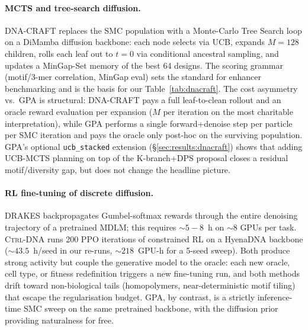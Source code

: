 \documentclass{article}
\theoremstyle{definition}
\theoremstyle{remark}
\newcommand{\gpa}{\textsc{GPA}\xspace}
\newcommand{\drakes}{\textsc{DRAKES}\xspace}
\newcommand{\ctrldna}{\textsc{Ctrl-DNA}\xspace}
\newcommand{\dnacraft}{\textsc{DNA-CRAFT}\xspace}
\begin{document}
\paragraph{MCTS and tree-search diffusion.}
\dnacraft{} \citep{dnacraft2026} replaces the SMC population with a Monte-Carlo Tree Search loop on a DiMamba diffusion backbone: each node selects via UCB, expands $M\!=\!128$ children, rolls each leaf out to $t\!=\!0$ via conditional ancestral sampling, and updates a MinGap-Set memory of the best 64 designs. The scoring grammar (motif/3-mer correlation, MinGap eval) sets the standard for enhancer benchmarking and is the basis for our Table~\ref{tab:dnacraft}. The cost asymmetry vs.\ \gpa{} is structural: \dnacraft{} pays a full leaf-to-clean rollout and an oracle reward evaluation per expansion ($M$ per iteration on the most charitable interpretation), while \gpa{} performs a single forward+denoise step per particle per SMC iteration and pays the oracle only post-hoc on the surviving population. \gpa{}'s optional \texttt{ucb\_stacked} extension (\S\ref{sec:results:dnacraft}) shows that adding UCB-MCTS planning on top of the K-branch+DPS proposal closes a residual motif/diversity gap, but does not change the headline picture.

\paragraph{RL fine-tuning of discrete diffusion.}
\drakes{} \citep{drakes2024} backpropagates Gumbel-softmax rewards through the entire denoising trajectory of a pretrained MDLM; this requires $\sim\!5\!-\!8$~h on $\sim\!8$ GPUs per task. \ctrldna{} \citep{ctrldna2025} runs 200 PPO iterations of constrained RL on a HyenaDNA backbone ($\sim\!43.5$~h/seed in our re-runs, $\sim\!218$~GPU-h for a 5-seed sweep). Both produce strong activity but couple the generative model to the oracle: each new oracle, cell type, or fitness redefinition triggers a new fine-tuning run, and both methods drift toward non-biological tails (homopolymers, near-deterministic motif tiling) that escape the regularisation budget. \gpa{}, by contrast, is a strictly inference-time SMC sweep on the same pretrained backbone, with the diffusion prior providing naturalness for free.
\end{document}
